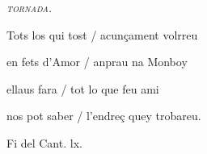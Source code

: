 \documentclass[12pt]{article}
\begin{document}
\begin{estrofaExtra}%




\begin{tornada}

\pagina{[69v]} \textit{\textsc{tornada.}}

\end{tornada}


\end{estrofaExtra}


\begin{estrofa}

 Tots los qui tost / acun\c{c}ament volrreu

 en fets d'Amor / anprau na Monboy

 ellaus fara / tot lo que feu ami

 nos pot saber / l'endre\c{c} quey trobareu.

\end{estrofa}



\begin{estrofaExtra}%

\begin{final}

Fi del Cant. lx.

\end{final}

\end{estrofaExtra}
\end{document}
